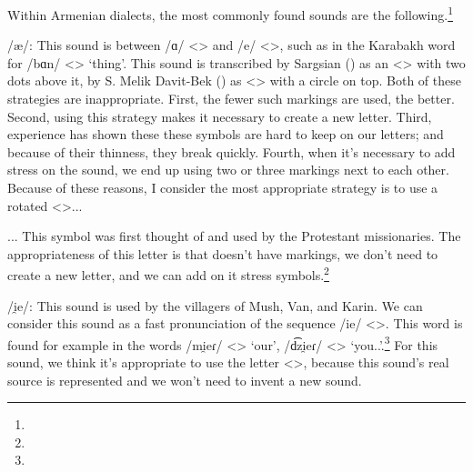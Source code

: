Within Armenian dialects, the most commonly found sounds are the following.\footnote{}

/æ/: This sound is between /ɑ/ <> and /e/ <>, such as in the Karabakh word for /bɑn/ <> `thing'. This sound is transcribed by Sargsian () as an <> with two dots above it, by S. Melik Davit-Bek () as <> with a circle on top. Both of these strategies are inappropriate. First, the fewer such markings are used, the better. Second, using this strategy makes it necessary to create a new letter. Third, experience has shown these these symbols are hard to keep on our letters; and because of their thinness, they break quickly. Fourth, when it's necessary to add stress on the sound, we end up using two or three markings next to each other. Because of these reasons, I consider the most appropriate strategy is to use a rotated <>... 

\begin{adjarianpage}\label{page:10}\end{adjarianpage}%

... This symbol was first thought of and used by the Protestant missionaries. The appropriateness of this letter is that doesn't have markings, we don't need to create a new letter, and we can add on it stress symbols.\footnote{}

/i̯e/: This sound is used by the villagers of Mush, Van, and Karin. We can consider this sound as a fast pronunciation of the sequence /ie/ <>. This word is found for example in the words /mi̯eɾ/ <> `our', /d͡zi̯eɾ/ <> `you.{\gen}.{\pl}'.\footnote{} For this sound, we think it's appropriate to use the letter <>, because this sound's real source is represented and we won't need to invent a new sound.

